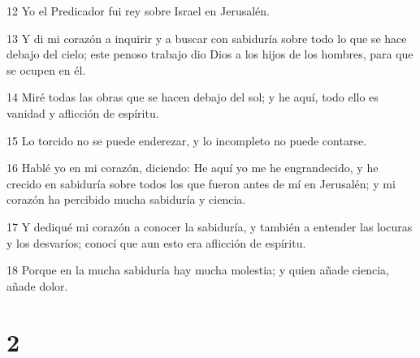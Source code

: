 \par 12 Yo el Predicador fui rey sobre Israel en Jerusalén.
\par 13 Y di mi corazón a inquirir y a buscar con sabiduría sobre todo lo que se hace debajo del cielo; este penoso trabajo dio Dios a los hijos de los hombres, para que se ocupen en él.
\par 14 Miré todas las obras que se hacen debajo del sol; y he aquí, todo ello es vanidad y aflicción de espíritu.
\par 15 Lo torcido no se puede enderezar, y lo incompleto no puede contarse. 
\par 16 Hablé yo en mi corazón, diciendo: He aquí yo me he engrandecido, y he crecido en sabiduría sobre todos los que fueron antes de mí en Jerusalén; y mi corazón ha percibido mucha sabiduría y ciencia.
\par 17 Y dediqué mi corazón a conocer la sabiduría, y también a entender las locuras y los desvaríos; conocí que aun esto era aflicción de espíritu.
\par 18 Porque en la mucha sabiduría hay mucha molestia; y quien añade ciencia, añade dolor.

\chapter{2}

